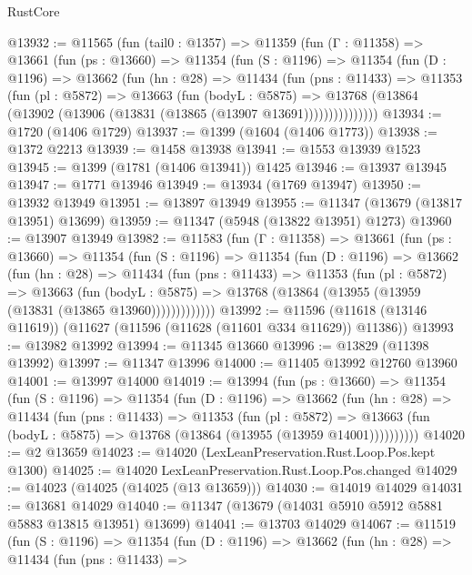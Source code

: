 \begin{lexlean}{RustCore}
\begin{coremodule}
@13932 := @11565
    (fun (tail0 : @1357) =>
    @11359
      (fun (Γ : @11358) =>
      @13661
        (fun (ps : @13660) =>
        @11354
          (fun (S : @1196) =>
          @11354
            (fun (D : @1196) =>
            @13662
              (fun (hn : @28) =>
              @11434
                (fun (pns : @11433) =>
                @11353
                  (fun (pl : @5872) =>
                  @13663
                    (fun (bodyL : @5875) =>
                    @13768 (@13864 (@13902 (@13906 (@13831 (@13865 (@13907 @13691)))))))))))))))
@13934 := @1720 (@1406 @1729)
@13937 := @1399 (@1604 (@1406 @1773))
@13938 := @1372 @2213
@13939 := @1458 @13938
@13941 := @1553 @13939 @1523
@13945 := @1399 (@1781 (@1406 @13941)) @1425
@13946 := @13937 @13945
@13947 := @1771 @13946
@13949 := @13934 (@1769 @13947)
@13950 := @13932 @13949
@13951 := @13897 @13949
@13955 := @11347 (@13679 (@13817 @13951) @13699)
@13959 := @11347 (@5948 (@13822 @13951) @1273)
@13960 := @13907 @13949
@13982 := @11583
    (fun (Γ : @11358) =>
    @13661
      (fun (ps : @13660) =>
      @11354
        (fun (S : @1196) =>
        @11354
          (fun (D : @1196) =>
          @13662
            (fun (hn : @28) =>
            @11434
              (fun (pns : @11433) =>
              @11353
                (fun (pl : @5872) =>
                @13663
                  (fun (bodyL : @5875) =>
                  @13768 (@13864 (@13955 (@13959 (@13831 (@13865 @13960)))))))))))))
@13992 := @11596 (@11618 (@13146 @11619)) (@11627 (@11596 (@11628 (@11601 @334 @11629)) @11386))
@13993 := @13982 @13992
@13994 := @11345 @13660
@13996 := @13829 (@11398 @13992)
@13997 := @11347 @13996
@14000 := @11405 @13992 @12760 @13960
@14001 := @13997 @14000
@14019 := @13994
    (fun (ps : @13660) =>
    @11354
      (fun (S : @1196) =>
      @11354
        (fun (D : @1196) =>
        @13662
          (fun (hn : @28) =>
          @11434
            (fun (pns : @11433) =>
            @11353
              (fun (pl : @5872) =>
              @13663 (fun (bodyL : @5875) => @13768 (@13864 (@13955 (@13959 @14001))))))))))
@14020 := @2 @13659
@14023 := @14020 (LexLeanPreservation.Rust.Loop.Pos.kept @1300)
@14025 := @14020 LexLeanPreservation.Rust.Loop.Pos.changed
@14029 := @14023 (@14025 (@14025 (@13 @13659)))
@14030 := @14019 @14029
@14031 := @13681 @14029
@14040 := @11347 (@13679 (@14031 @5910 @5912 @5881 @5883 @13815 @13951) @13699)
@14041 := @13703 @14029
@14067 := @11519
    (fun (S : @1196) =>
    @11354
      (fun (D : @1196) =>
      @13662
        (fun (hn : @28) =>
        @11434
          (fun (pns : @11433) =>

\end{coremodule}
\end{lexlean}
